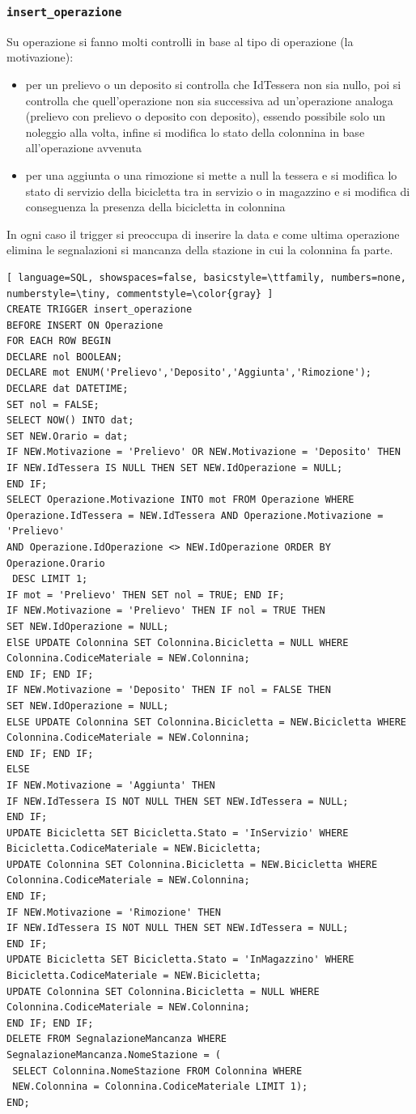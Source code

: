 \documentclass[a4paper,twoside]{article}
\begin{document}
\subsubsection{\texttt{insert\_operazione}}
Su operazione si fanno molti controlli in base al tipo di operazione (la motivazione):
\begin{itemize}
 \item per un prelievo o un deposito si controlla che IdTessera non sia nullo, poi si controlla che quell'operazione non sia successiva ad un'operazione analoga (prelievo con prelievo o deposito con deposito), essendo possibile solo un noleggio alla volta, infine si modifica lo stato della colonnina in base all'operazione avvenuta
 \item per una aggiunta o una rimozione si mette a null la tessera e si modifica lo stato di servizio della bicicletta tra in servizio o in magazzino e si modifica di conseguenza la presenza della bicicletta in colonnina
\end{itemize}
In ogni caso il trigger si preoccupa di inserire la data e come ultima operazione elimina le segnalazioni si mancanza della stazione in cui la colonnina fa parte.
\begin{lstlisting}[ language=SQL, showspaces=false, basicstyle=\ttfamily, numbers=none, numberstyle=\tiny, commentstyle=\color{gray} ]
CREATE TRIGGER insert_operazione
BEFORE INSERT ON Operazione
FOR EACH ROW BEGIN
DECLARE nol BOOLEAN;
DECLARE mot ENUM('Prelievo','Deposito','Aggiunta','Rimozione');
DECLARE dat DATETIME;
SET nol = FALSE;
SELECT NOW() INTO dat;
SET NEW.Orario = dat;
IF NEW.Motivazione = 'Prelievo' OR NEW.Motivazione = 'Deposito' THEN
IF NEW.IdTessera IS NULL THEN SET NEW.IdOperazione = NULL;
END IF;
SELECT Operazione.Motivazione INTO mot FROM Operazione WHERE
Operazione.IdTessera = NEW.IdTessera AND Operazione.Motivazione = 'Prelievo'
AND Operazione.IdOperazione <> NEW.IdOperazione ORDER BY Operazione.Orario
 DESC LIMIT 1;
IF mot = 'Prelievo' THEN SET nol = TRUE; END IF;
IF NEW.Motivazione = 'Prelievo' THEN IF nol = TRUE THEN
SET NEW.IdOperazione = NULL;
ElSE UPDATE Colonnina SET Colonnina.Bicicletta = NULL WHERE
Colonnina.CodiceMateriale = NEW.Colonnina;
END IF; END IF;
IF NEW.Motivazione = 'Deposito' THEN IF nol = FALSE THEN
SET NEW.IdOperazione = NULL;
ELSE UPDATE Colonnina SET Colonnina.Bicicletta = NEW.Bicicletta WHERE
Colonnina.CodiceMateriale = NEW.Colonnina;
END IF; END IF;
ELSE
IF NEW.Motivazione = 'Aggiunta' THEN
IF NEW.IdTessera IS NOT NULL THEN SET NEW.IdTessera = NULL;
END IF;
UPDATE Bicicletta SET Bicicletta.Stato = 'InServizio' WHERE
Bicicletta.CodiceMateriale = NEW.Bicicletta;
UPDATE Colonnina SET Colonnina.Bicicletta = NEW.Bicicletta WHERE
Colonnina.CodiceMateriale = NEW.Colonnina;
END IF;
IF NEW.Motivazione = 'Rimozione' THEN
IF NEW.IdTessera IS NOT NULL THEN SET NEW.IdTessera = NULL;
END IF;
UPDATE Bicicletta SET Bicicletta.Stato = 'InMagazzino' WHERE
Bicicletta.CodiceMateriale = NEW.Bicicletta;
UPDATE Colonnina SET Colonnina.Bicicletta = NULL WHERE
Colonnina.CodiceMateriale = NEW.Colonnina;
END IF; END IF;
DELETE FROM SegnalazioneMancanza WHERE
SegnalazioneMancanza.NomeStazione = (
 SELECT Colonnina.NomeStazione FROM Colonnina WHERE
 NEW.Colonnina = Colonnina.CodiceMateriale LIMIT 1);
END;
\end{lstlisting}
\end{document}
